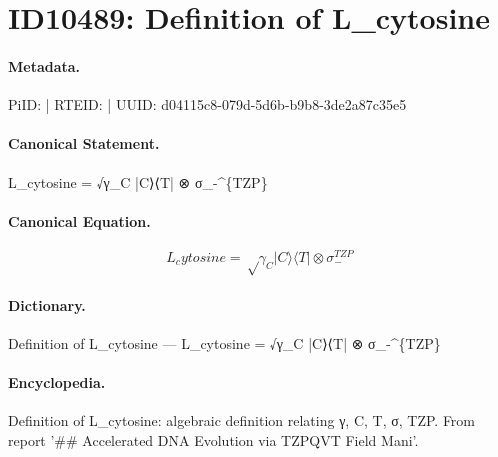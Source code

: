 \section*{ID10489: Definition of L\_cytosine}
\paragraph{Metadata.}
PiID:  | RTEID:  | UUID: d04115c8-079d-5d6b-b9b8-3de2a87c35e5

\paragraph{Canonical Statement.}
L\_cytosine = √γ\_C |C⟩⟨T| ⊗ σ\_-\textasciicircum{}\{TZP\}

\paragraph{Canonical Equation.}
\[
L_cytosine = √γ_C |C⟩⟨T| ⊗ σ_-^{TZP}
\]

\paragraph{Dictionary.}
Definition of L\_cytosine — L\_cytosine = √γ\_C |C⟩⟨T| ⊗ σ\_-\textasciicircum{}\{TZP\}

\paragraph{Encyclopedia.}
Definition of L\_cytosine: algebraic definition relating γ, C, T, σ, TZP. From report '\#\# Accelerated DNA Evolution via TZPQVT Field Mani'.
